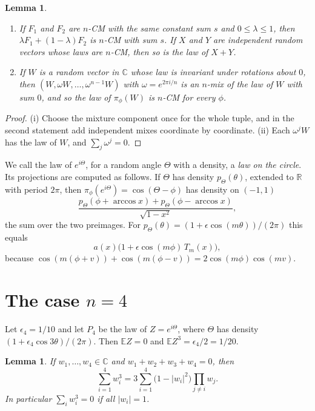 \documentclass[11pt]{article}
\newtheorem{lemma}[theorem]{Lemma}
\theoremstyle{definition}
\theoremstyle{remark}
\newcommand{\R}{\mathbb{R}}
\newcommand{\C}{\mathbb{C}}
\newcommand{\E}{\mathbb{E}}
\begin{document}
\begin{lemma}\label{lem:basic}
\begin{enumerate}[label=(\roman*)]
\item If $F_1$ and $F_2$ are $n$-CM with the same constant sum $s$ and $0\le\lambda\le1$, then
$\lambda F_1+(1-\lambda)F_2$ is $n$-CM with sum $s$. If $X$ and $Y$ are independent random vectors whose laws are
$n$-CM, then so is the law of $X+Y$.
\item If $W$ is a random vector in $\C$ whose law is invariant under rotations about $0$, then
$(W,\omega W,\dots,\omega^{n-1}W)$ with $\omega=e^{2\pi i/n}$ is an $n$-mix of the law of $W$ with sum $0$, and so
the law of $\pi_\phi(W)$ is $n$-CM for every $\phi$.
\end{enumerate}
\end{lemma}

\begin{proof}
(i) Choose the mixture component once for the whole tuple, and in the second statement add independent mixes
coordinate by coordinate. (ii) Each $\omega^jW$ has the law of $W$, and $\sum_j\omega^j=0$.
\end{proof}

We call the law of $e^{i\Theta}$, for a random angle $\Theta$ with a density, a \emph{law on the circle}. Its projections are computed as follows. If $\Theta$ has density $p_\Theta(\theta)$, extended to $\R$ with period $2\pi$, then
$\pi_\phi(e^{i\Theta})=\cos(\Theta-\phi)$ has density on $(-1,1)$
\begin{equation}\label{eq:proj}
\frac{p_\Theta(\phi+\arccos x)+p_\Theta(\phi-\arccos x)}{\sqrt{1-x^2}},
\end{equation}
the sum over the two preimages. For $p_\Theta(\theta)=(1+\epsilon\cos(m\theta))/(2\pi)$ this equals
\begin{equation}\label{eq:projm}
a(x)\bigl(1+\epsilon\cos(m\phi)\,T_m(x)\bigr),
\end{equation}
because $\cos(m(\phi+v))+\cos(m(\phi-v))=2\cos(m\phi)\cos(mv)$.

\section{The case \texorpdfstring{$n=4$}{n=4}}\label{sec:four}

Let $\epsilon_4=1/10$ and let $P_4$ be the law of $Z=e^{i\Theta}$, where $\Theta$ has density
$(1+\epsilon_4\cos 3\theta)/(2\pi)$. Then $\E Z=0$ and $\E Z^3=\epsilon_4/2=1/20$.

\begin{lemma}\label{lem:cubic}
If $w_1,\dots,w_4\in\C$ and $w_1+w_2+w_3+w_4=0$, then
\[
\sum_{i=1}^4 w_i^3=3\sum_{i=1}^4\bigl(1-|w_i|^2\bigr)\prod_{j\ne i}w_j .
\]
In particular $\sum_i w_i^3=0$ if all $|w_i|=1$.
\end{lemma}
\end{document}
